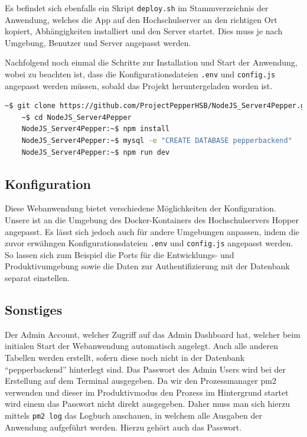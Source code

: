 Es befindet sich ebenfalls ein Skript \verb|deploy.sh| im Stammverzeichnis der Anwendung, welches die App auf den Hochschulserver an den richtigen Ort kopiert, Abhängigkeiten installiert und den Server startet. Dies muss je nach Umgebung, Benutzer und Server
angepasst werden.

Nachfolgend noch einmal die Schritte zur Installation und Start der Anwendung, wobei zu beachten ist,
dass die Konfigurationsdateien \verb|.env| und \verb|config.js| angepasst werden müssen, sobald das Projekt heruntergeladen
worden ist.\\

\begin{lstlisting}[language=Bash, basicstyle=\footnotesize,xleftmargin=-.1in]
    ~$ git clone https://github.com/ProjectPepperHSB/NodeJS_Server4Pepper.git 
    ~$ cd NodeJS_Server4Pepper
    NodeJS_Server4Pepper:~$ npm install
    NodeJS_Server4Pepper:~$ mysql -e "CREATE DATABASE pepperbackend"
    NodeJS_Server4Pepper:~$ npm run dev
\end{lstlisting}
\vspace{.3cm}

\subsection*{Konfiguration}
\label{sec:nodechapter-config}
Diese Webanwendung bietet verschiedene Möglichkeiten der Konfiguration. Unsere ist an die Umgebung des Docker-Kontainers
des Hochschulservers Hopper angepasst. Es lässt sich jedoch auch für andere Umgebungen anpassen, indem die zuvor erwähngen Konfigurationsdateien \verb|.env| und \verb|config.js| angepasst werden. So lassen sich zum Beispiel die Ports für die Entwicklungs- und Produktivumgebung sowie die Daten zur Authentifizierung mit der Datenbank separat einstellen.\\


\subsection*{Sonstiges}
\label{sec:nodechapter-install-other}
Der Admin Account, welcher Zugriff auf das Admin Dashboard hat, welcher beim initialen Start der Webanwendung automatisch angelegt. Auch alle anderen Tabellen werden erstellt, sofern diese noch nicht in der Datenbank ``pepperbackend'' hinterlegt sind. Das Passwort des Admin Users wird bei der Erstellung auf dem Terminal ausgegeben. Da wir den Prozessmanager pm2 verwenden und dieser im Produktivmodus den Prozess im Hintergrund startet wird einem das Passwort nicht direkt ausgegeben. Daher muss man sich hierzu mittels \verb|pm2 log| das Logbuch anschauen, in welchem alle Ausgaben der Anwendung aufgeführt werden. Hierzu gehört auch das Passwort.\\



